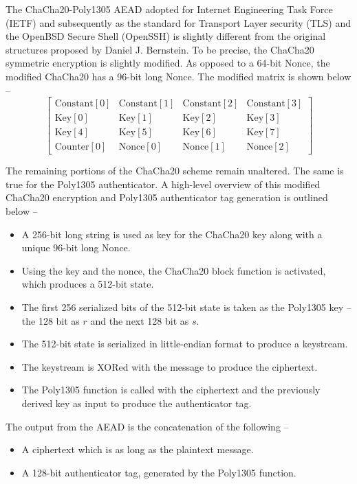 \documentclass[a4paper]{cas-sc}
\begin{document}
The ChaCha20-Poly1305 AEAD adopted for Internet Engineering Task Force (IETF) \cite{rfc8439} and subsequently as the standard for Transport Layer security (TLS) \cite{rfc7905} and the OpenBSD Secure Shell (OpenSSH) \cite{miller2015chacha20} is slightly different from the original structures proposed by Daniel J. Bernstein. To be precise, the ChaCha20 symmetric encryption is slightly modified. As opposed to a 64-bit Nonce, the modified ChaCha20 has a 96-bit long Nonce. The modified matrix is shown below --
\begin{equation}\label{initialStateMod}
    \left[
        \begin{array}{cccc}
            \text{Constant}[0] & \text{Constant}[1] & \text{Constant}[2] & \text{Constant}[3] \\
            \text{Key}[0]      & \text{Key}[1]      & \text{Key}[2]      & \text{Key}[3]      \\
            \text{Key}[4]      & \text{Key}[5]      & \text{Key}[6]      & \text{Key}[7]      \\
            \text{Counter}[0]  & \text{Nonce}[0]    & \text{Nonce}[1]    & \text{Nonce}[2]
        \end{array}
        \right]
\end{equation}

The remaining portions of the ChaCha20 scheme remain unaltered. The same is true for the Poly1305 authenticator. A high-level overview of this modified ChaCha20 encryption and Poly1305 authenticator tag generation is outlined below --
\begin{itemize}
    \item A 256-bit long string is used as key for the ChaCha20 key along with a unique 96-bit long Nonce.
    \item Using the key and the nonce, the ChaCha20 block function is activated, which produces a 512-bit state.
    \item The first 256 serialized bits of the 512-bit state is taken as the Poly1305 key -- the 128 bit as $r$ and the next 128 bit as $s$.
    \item The 512-bit state is serialized in little-endian format to produce a keystream.
    \item The keystream is XORed with the message to produce the ciphertext.
    \item The Poly1305 function is called with the ciphertext and the previously derived key as input to produce the authenticator tag.
\end{itemize}
The output from the AEAD is the concatenation of the following --
\begin{itemize}
    \item A ciphertext which is as long as the plaintext message.
    \item A 128-bit authenticator tag, generated by the Poly1305 function.
\end{itemize}
\end{document}
